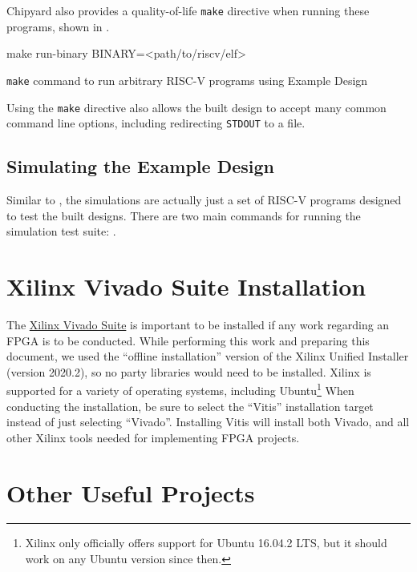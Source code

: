 Chipyard also provides a quality-of-life \texttt{make} directive when running these programs, shown in .

\begin{listing}[h!tbp]
\begin{bashsource}
make run-binary BINARY=<path/to/riscv/elf>
\end{bashsource}
\caption{\texttt{make} command to run arbitrary RISC-V programs using Example Design}
\label{lst:Running_Example_Design-Make}
\end{listing}

Using the \texttt{make} directive also allows the built design to accept many common command line options, including redirecting \texttt{STDOUT} to a file.

\subsection{Simulating the Example Design}\label{sec:Simulating_Example_Design}
Similar to , the simulations are actually just a set of RISC-V programs designed to test the built designs.
There are two main commands for running the simulation test suite: .


\section{Xilinx Vivado Suite Installation}\label{sec:Xilinx_Vivado_Suide_Install}
The \href{https://www.xilinx.com/support/download.html}{Xilinx Vivado Suite} is important to be installed if any work regarding an FPGA is to be conducted.
While performing this work and preparing this document, we used the ``offline installation'' version of the Xilinx Unified Installer (version 2020.2), so no  party libraries would need to be installed.
Xilinx is supported for a variety of operating systems, including Ubuntu\footnote{Xilinx only officially offers support for Ubuntu 16.04.2 LTS, but it should work on any Ubuntu version since then.}
When conducting the installation, be sure to select the ``Vitis'' installation target instead of just selecting ``Vivado''.
Installing Vitis will install both Vivado, and all other Xilinx tools needed for implementing FPGA projects.

\section{Other Useful Projects}\label{sec:Other_Useful_Projects}
